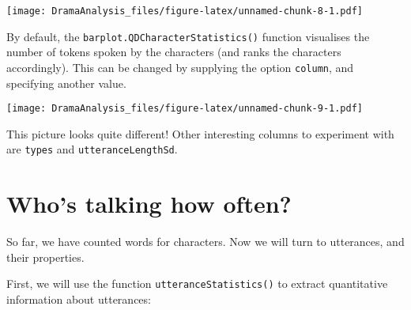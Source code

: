 \documentclass[]{book}
\newenvironment{Shaded}{\begin{snugshade}}{\end{snugshade}}
\newcommand{\CommentTok}[1]{\textcolor[rgb]{0.56,0.35,0.01}{\textit{#1}}}
\newcommand{\DataTypeTok}[1]{\textcolor[rgb]{0.13,0.29,0.53}{#1}}
\newcommand{\KeywordTok}[1]{\textcolor[rgb]{0.13,0.29,0.53}{\textbf{#1}}}
\newcommand{\NormalTok}[1]{#1}
\newcommand{\OperatorTok}[1]{\textcolor[rgb]{0.81,0.36,0.00}{\textbf{#1}}}
\newcommand{\OtherTok}[1]{\textcolor[rgb]{0.56,0.35,0.01}{#1}}
\newcommand{\StringTok}[1]{\textcolor[rgb]{0.31,0.60,0.02}{#1}}
\begin{document}
\begin{Shaded}
\end{Shaded}

\texttt{[image: DramaAnalysis\_files/figure-latex/unnamed-chunk-8-1.pdf]}

By default, the \texttt{barplot.QDCharacterStatistics()} function visualises the number of tokens spoken by the characters (and ranks the characters accordingly). This can be changed by supplying the option \texttt{column}, and specifying another value.

\begin{Shaded}
\end{Shaded}

\texttt{[image: DramaAnalysis\_files/figure-latex/unnamed-chunk-9-1.pdf]}

This picture looks quite different! Other interesting columns to experiment with are \texttt{types} and \texttt{utteranceLengthSd}.

\hypertarget{whos-talking-how-often}{%
\chapter{Who's talking how often?}\label{whos-talking-how-often}}

So far, we have counted words for characters. Now we will turn to utterances, and their properties.

First, we will use the function \texttt{utteranceStatistics()} to extract quantitative information about utterances:
\end{document}
